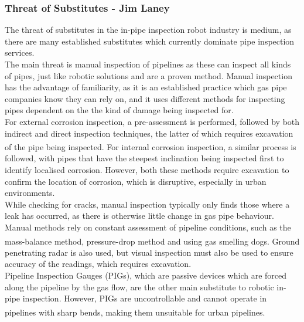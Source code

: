 \documentclass[11pt]{article}		%
\newcommand{\supercite}[1]{\textsuperscript{\cite{#1}}}		%
\begin{document}
	       \subsubsection{Threat of Substitutes - Jim Laney}
				
				The threat of substitutes in the in-pipe inspection robot industry is medium, as there are many established substitutes which currently dominate pipe inspection services.
				\\
                \hspace*{2ex}The main threat is manual inspection of pipelines as these can inspect all kinds of pipes, just like robotic solutions and are a proven method.
				Manual inspection has the advantage of familiarity, as it is an established practice which gas pipe companies know they can rely on, and it uses different methods for inspecting pipes dependent on the the kind of damage being inspected for.
				\\
                \hspace*{2ex}For external corrosion inspection, a pre-assessment is performed, followed by both indirect and direct inspection techniques, the latter of which requires excavation of the pipe being inspected\supercite{kishawy2010review}. 
				For internal corrosion inspection, a similar process is followed, with pipes that have the steepest inclination being inspected first to identify localised corrosion. 
				However, both these methods require excavation to confirm the location of corrosion, which is disruptive, especially in urban environments.
				\\
                \hspace*{2ex}While checking for cracks, manual inspection typically only finds those where a leak has occurred, as there is otherwise little change in gas pipe behaviour.
				Manual methods rely on constant assessment of pipeline conditions, such as the mass-balance method, pressure-drop method and using gas smelling dogs\supercite{kishawy2010review}.
				Ground penetrating radar is also used, but visual inspection must also be used to ensure accuracy of the readings, which requires excavation.
				\\
                \hspace*{2ex}Pipeline Inspection Gauges (PIGs), which are passive devices which are forced along the pipeline by the gas flow, are the other main substitute to robotic in-pipe inspection.
				However, PIGs are uncontrollable and cannot operate in pipelines with sharp bends\supercite{mills2017advances}, making them unsuitable for urban pipelines.
\end{document}
